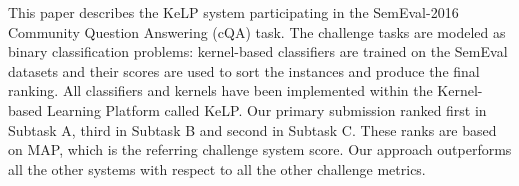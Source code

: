 This paper describes the KeLP system participating in the SemEval-2016 Community Question Answering (cQA) task. The challenge tasks are modeled as binary classification problems: kernel-based classifiers are trained on the SemEval datasets and their  scores are used to sort the instances and produce the final ranking. All classifiers and kernels have been implemented within the Kernel-based Learning Platform called KeLP. Our primary submission ranked first in Subtask A, third in Subtask B and second in Subtask C. These ranks are based on MAP, which is the referring challenge system score. Our approach outperforms all the other systems with respect to all the other challenge metrics.

